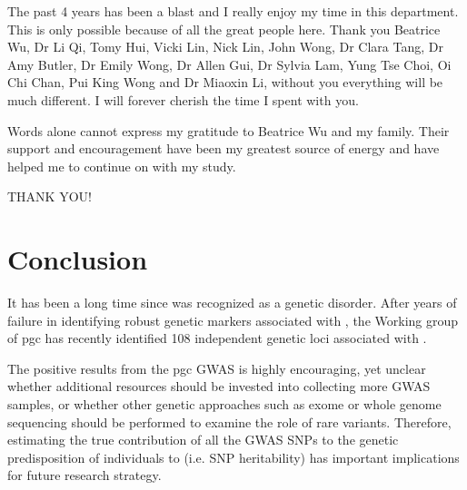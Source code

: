 \documentclass[12pt]{scrbook}
\newcommand*{\glng}{\glsentrylong}
\newcommand*{\Glng}{\Glsentrylong}
\begin{document}
	The past 4 years has been a blast and I really enjoy my time in this department.
	This is only possible because of all the great people here.
	Thank you Beatrice Wu, Dr Li Qi, Tomy Hui, Vicki Lin, Nick Lin, John Wong, Dr Clara Tang, Dr Amy Butler, Dr Emily Wong, Dr Allen Gui, Dr Sylvia Lam, Yung Tse Choi, Oi Chi Chan, Pui King Wong and Dr Miaoxin Li, without you everything will be much different.
	I will forever cherish the time I spent with you. 
	
	Words alone cannot express my gratitude to Beatrice Wu and my family.
	Their support and encouragement have been my greatest source of energy and have helped me to continue on with my study. 
	
	\begin{center}
	\large THANK YOU!
	\end{center}
	\cleardoublepage
	\begin{singlespace}
	\printglossary[title=Abbreviations,toctitle=Abbreviations,style=long,nonumberlist]
	\cleardoublepage
	
	\cleardoublepage
	
		\setcounter{tocdepth}{3}
		\tableofcontents
		\listoffigures
		\listoftables
	\end{singlespace}
\mainmatter
\pagestyle{fancy}

\setlength{\parindent}{4em}
\setlength{\parskip}{0.75em}
	
	
	
	
	\chapter{Conclusion}
	\label{conclusionChapter}
	\glsresetall
	It has been a long time since \glng{scz} was recognized as a genetic disorder. 
	After years of failure in identifying robust genetic markers associated with \glng{scz}, the \Glng{scz} Working group of \gls{pgc} has recently identified 108 independent genetic loci associated with \glng{scz} \citep{Ripke2014}.
	
	The positive results from the \gls{pgc} \glng{scz} \gls{GWAS} is highly encouraging, yet unclear whether additional resources should be invested into collecting more \gls{GWAS} samples, or whether other genetic approaches such as exome or whole genome sequencing should be performed to examine the role of rare variants. 
	Therefore, estimating the true contribution of all the \gls{GWAS} \glspl{SNP} to the genetic predisposition of individuals to \glng{scz} (i.e. \gls{SNP} heritability) has important implications for future research strategy.
	
\end{document}
